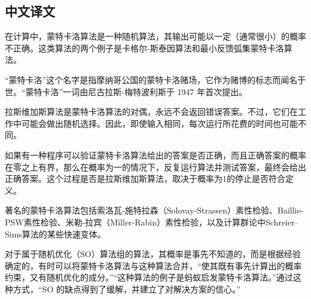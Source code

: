 \subsection*{中文译文}
在计算中，蒙特卡洛算法是一种随机算法，其输出可能以一定（通常很小）的概率不正确。这类算法的两个例子是卡格尔-斯泰因算法和最小反馈弧集蒙特卡洛算法。\par
“蒙特卡洛”这个名字是指摩纳哥公国的蒙特卡洛赌场，它作为赌博的标志而闻名于世。“蒙特卡洛”一词由尼古拉斯-梅特波利斯于 1947 年首次提出。\par
拉斯维加斯算法是蒙特卡洛算法的对偶，永远不会返回错误答案。不过，它们在工作中可能会做出随机选择。因此，即使输入相同，每次运行所花费的时间也可能不同。\par
如果有一种程序可以验证蒙特卡洛算法给出的答案是否正确，而且正确答案的概率在零之上有界，那么在概率为一的情况下，反复运行算法并测试答案，最终会给出正确答案。这个过程是否是拉斯维加斯算法，取决于概率为1的停止是否符合定义。\par
著名的蒙特卡洛算法包括索洛瓦-施特拉森（Solovay-Strassen）素性检验、Baillie-PSW素性检验、米勒-拉宾（Miller-Rabin）素性检验，以及计算群论中Schreier–Sims算法的某些快速变体。\par
对于属于随机优化（SO）算法组的算法，其概率是事先不知道的，而是根据经验确定的，有时可以将蒙特卡洛算法与这种算法合并，“使其既有事先计算出的概率约束，又有随机优化的成分。”“这种算法的例子是蚂蚁启发蒙特卡洛算法。”通过这种方式，“SO 的缺点得到了缓解，并建立了对解决方案的信心。”\par
\clearpage

